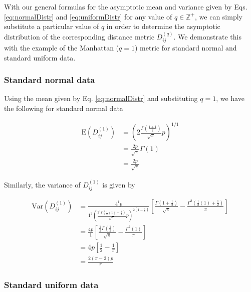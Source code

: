 \documentclass[10pt,letterpaper]{article}\usepackage[]{graphicx}\usepackage[]{color}
\begin{document}
With our general formulas for the asymptotic mean and variance given by Eqs. \ref{eq:normalDistr} and \ref{eq:uniformDistr} for any value of $q \in \mathbb{Z}^+$, we can simply substitute a particular value of $q$ in order to determine the asymptotic distribution of the corresponding distance metric $D^{(q)}_{ij}$. We demonstrate this with the example of the Manhattan ($q=1$) metric for standard normal and standard uniform data.

\subsubsection{Standard normal data}

Using the mean given by Eq. \ref{eq:normalDistr} and substituting $q=1$, we have the following for standard normal data

\begin{equation}\label{eq:normalManMean}
\begin{aligned}
\text{E}\left(D^{(1)}_{ij}\right) &= \left(2\frac{\Gamma\left(\frac{1 + 1}{2}\right)}{\sqrt{\pi}}p\right)^{1/1} \\
&= \frac{2p}{\sqrt{\pi}}\Gamma(1) \\
&= \frac{2p}{\sqrt{\pi}}
\end{aligned}
\end{equation}

Similarly, the variance of $D^{(1)}_{ij}$ is given by

\begin{equation}\label{eq:normalManVar}
\begin{aligned}
\text{Var}\left(D^{(1)}_{ij}\right) &= \frac{4^1p}{1^2\left(\frac{2^1\Gamma\left(\frac{1}{2}(1) + \frac{1}{2}\right)}{\sqrt{\pi}}p\right)^{2\left(1 - \frac{1}{1}\right)}}\left[\frac{\Gamma\left(1 + \frac{1}{2}\right)}{\sqrt{\pi}} - \frac{\Gamma^2\left(\frac{1}{2}(1) + \frac{1}{2}\right)}{\pi}\right] \\
&= \frac{4p}{1}\left[\frac{\frac{1}{2}\Gamma\left(\frac{1}{2}\right)}{\sqrt{\pi}} - \frac{\Gamma^2(1)}{\pi}\right] \\
&= 4p\left[\frac{1}{2} - \frac{1}{\pi}\right] \\
&= \frac{2(\pi - 2)p}{\pi}
\end{aligned}
\end{equation}

\subsubsection{Standard uniform data}
\end{document}
